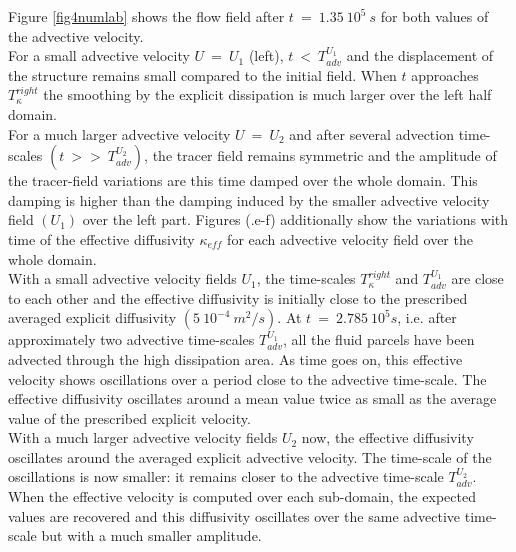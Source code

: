 Figure \ref{fig4numlab} shows the flow field after $t\ =\ 1.35\ 10^5 \ s$ for both values of the advective velocity. \\
For a small advective velocity $U\ =\ U_1$ (left), $t\ <\ T_{adv}^{U_1}$ and the displacement of the structure remains small compared to the initial field. When $t$ approaches $T_{\kappa}^{right}$ the smoothing by the explicit dissipation is much larger over the left half domain.\\ 
For a much larger advective velocity $U\ =\ U_2$ and after several advection time-scales $(t\ >>\ T_{adv}^{U_2})$, the tracer field remains symmetric
and the amplitude of the tracer-field variations are this time damped over the whole domain. This damping is higher than the damping induced by the smaller advective velocity field $(U_1)$ over the left part.
Figures (.e-f) additionally show the variations with time of the effective diffusivity $\kappa_{eff}$ for each advective velocity field over the whole domain. \\
With a small advective velocity fields $U_1$, the time-scales $T_{\kappa}^{right}$ and $T_{adv}^{U_1}$ are close to each other and the effective diffusivity is initially close to the prescribed averaged explicit diffusivity $(5 \ 10^{-4} \ m^2/s)$. At $t\ =\ 2.785\ 10^5 s$, i.e. after approximately two advective time-scales $T_{adv}^{U_1}$, all the fluid parcels have been advected through the high dissipation area.
As time goes on, this effective velocity shows oscillations over a period close to the advective time-scale. The effective diffusivity oscillates around a mean value twice as small as the average value of the prescribed explicit velocity. \\
With a much larger advective velocity fields $U_2$ now, the effective diffusivity oscillates around the averaged explicit advective velocity. The time-scale of the oscillations is now smaller: it remains closer to the advective time-scale $T_{adv}^{U_2}$.
When the effective velocity is computed over each sub-domain, the expected values are recovered and this diffusivity oscillates over the same advective time-scale but with a much smaller amplitude. 

